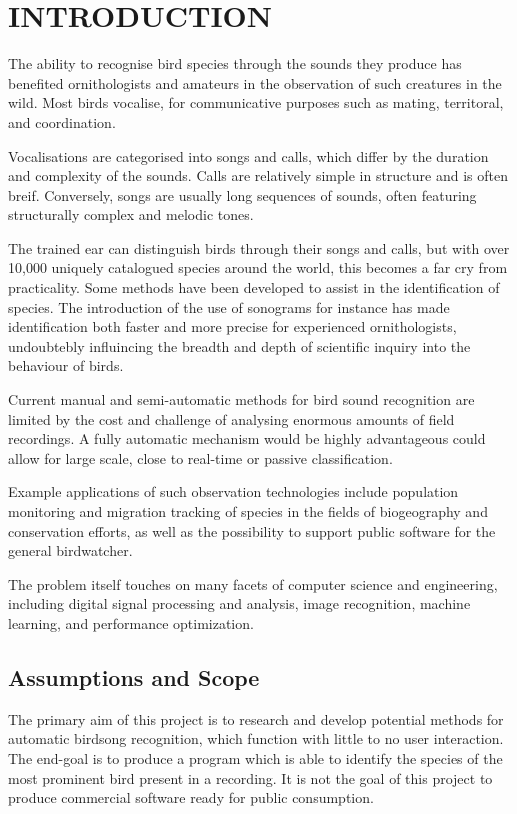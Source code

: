 \chapter{INTRODUCTION}

The ability to recognise bird species through the sounds they produce has
benefited ornithologists and amateurs in the observation of such creatures in
the wild.
Most birds vocalise, for communicative purposes such as mating, territoral, and
coordination.

Vocalisations are categorised into songs and calls, which differ by the duration
and complexity of the sounds.
Calls are relatively simple in structure and is often breif.
Conversely, songs are usually long sequences of sounds, often featuring
structurally complex and melodic tones.

The trained ear can distinguish birds through their songs and calls, but with
over 10,000 uniquely catalogued species around the world, this becomes a far cry
from practicality.
Some methods have been developed to assist in the identification of species.
The introduction of the use of sonograms for instance has made identification
both faster and more precise for experienced ornithologists, undoubtebly
influincing the breadth and depth of scientific inquiry into the behaviour of
birds.

Current manual and semi-automatic methods for bird sound recognition are limited
by the cost and challenge of analysing enormous amounts of field recordings.
A fully automatic mechanism would be highly advantageous could allow for
large scale, close to real-time or passive classification.

Example applications of such observation technologies include population monitoring
and migration tracking of species in the fields of biogeography and conservation
efforts, as well as the possibility to support public software for the general
birdwatcher.

The problem itself touches on many facets of computer science and engineering,
including digital signal processing and analysis, image recognition,
machine learning, and performance optimization.

\section{Assumptions and Scope}
The primary aim of this project is to research and develop potential methods
for automatic birdsong recognition, which function with little to no user
interaction.
The end-goal is to produce a program which is able to identify the species of
the most prominent bird present in a recording.
It is not the goal of this project to produce commercial software ready for
public consumption.

